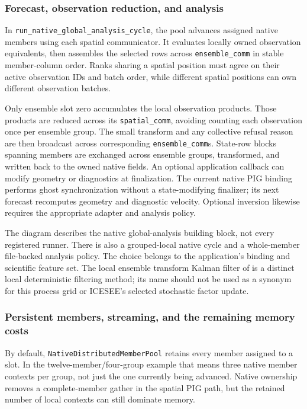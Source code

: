 \documentclass[11pt,a4paper]{article}
\newcommand{\code}[1]{\nolinkurl{#1}}
\begin{document}
\subsubsection{Forecast, observation reduction, and analysis}

In \code{run_native_global_analysis_cycle}, the pool advances assigned native members using each spatial communicator. It evaluates locally owned observation equivalents, then assembles the selected rows across \code{ensemble_comm} in stable member-column order. Ranks sharing a spatial position must agree on their active observation IDs and batch order, while different spatial positions can own different observation batches.

Only ensemble slot zero accumulates the local observation products. Those products are reduced across its \code{spatial_comm}, avoiding counting each observation once per ensemble group. The small transform and any collective refusal reason are then broadcast across corresponding \code{ensemble_comm}s. State-row blocks spanning members are exchanged across ensemble groups, transformed, and written back to the owned native fields. An optional application callback can modify geometry or diagnostics at finalization. The current native PIG binding performs ghost synchronization without a state-modifying finalizer; its next forecast recomputes geometry and diagnostic velocity. Optional inversion likewise requires the appropriate adapter and analysis policy.


The diagram describes the native global-analysis building block, not every registered runner. There is also a grouped-local native cycle and a whole-member file-backed analysis policy. The choice belongs to the application's binding and scientific feature set. The local ensemble transform Kalman filter of \citet{hunt2007} is a distinct local deterministic filtering method; its name should not be used as a synonym for this process grid or ICESEE's selected stochastic factor update.

\subsubsection{Persistent members, streaming, and the remaining memory costs}

By default, \code{NativeDistributedMemberPool} retains every member assigned to a slot. In the twelve-member/four-group example that means three native member contexts per group, not just the one currently being advanced. Native ownership removes a complete-member gather in the spatial PIG path, but the retained number of local contexts can still dominate memory.
\end{document}
